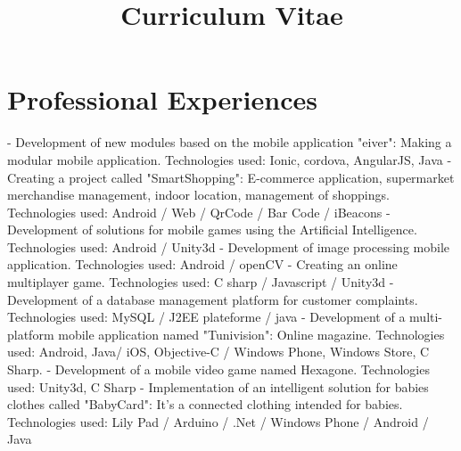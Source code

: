 \documentclass[11pt,a4paper,sans]{moderncv}        %
\title{Curriculum Vitae}                               %
\begin{document}
	\makecvtitle

	\section{Professional Experiences}
				{- Development of new modules based on the mobile application "eiver": Making a modular mobile application.
				\newline{}
				Technologies used: Ionic, cordova, AngularJS, Java
				}
				{- Creating a project called "SmartShopping": E-commerce application, supermarket merchandise management, indoor location, management of shoppings.
				\newline{}
				Technologies used: Android / Web / QrCode / Bar Code / iBeacons
				\newline{}
					\newline{}
				- Development of solutions for mobile games using the Artificial Intelligence.
				\newline{}
				Technologies used: Android / Unity3d
				\newline{}
					\newline{}
				- Development of image processing mobile application.
				\newline{}
				Technologies used: Android / openCV
				}
				{- Creating an online multiplayer game.
				\newline{}
				Technologies used: C sharp / Javascript / Unity3d
				}
				{- Development of a database management platform for customer complaints.
				\newline{}
				Technologies used:  MySQL / J2EE plateforme / java
				}
				{- Development of a multi-platform mobile application named "Tunivision": Online magazine.
				\newline{}
				Technologies used:  Android, Java/ iOS, Objective-C / Windows Phone, Windows Store, C Sharp.
				\newline{}
					\newline{}
				- Development of a mobile video game named Hexagone.
				\newline{}
				Technologies used: Unity3d, C Sharp
				\newline{}
					\newline{}
				- Implementation of an intelligent solution for babies clothes called "BabyCard": It's a connected clothing intended for babies.
				\newline{}
				Technologies used: Lily Pad / Arduino / .Net / Windows Phone / Android / Java
				}
\end{document}
